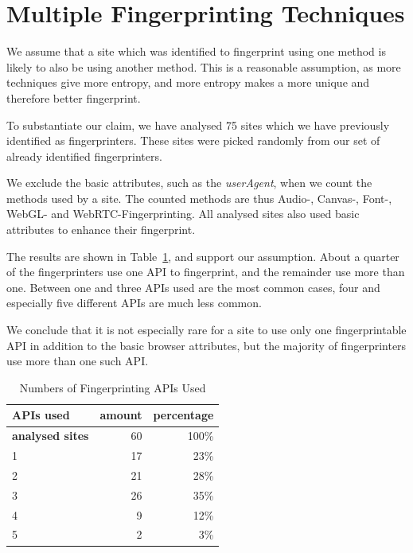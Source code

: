 \documentclass[
    fontsize=12pt,
    headings=small,
    parskip=half,
    bibliography=totoc,
    numbers=noenddot,
    open=any
    ]{scrreprt}
\begin{document}
\section{Multiple Fingerprinting Techniques}
\label{sec:correlation}

We assume that a site which was identified to fingerprint using one method is likely
to also be using another method.
This is a reasonable assumption, as more techniques give more entropy, and more entropy makes a more
unique and therefore better fingerprint.

To substantiate our claim, we have analysed 75 sites which we have previously identified as fingerprinters.
These sites were picked randomly from our set of already identified fingerprinters.

We exclude the basic attributes, such as the \textit{userAgent}, when we count the methods used by a site.
The counted methods are thus Audio-, Canvas-, Font-, WebGL- and WebRTC-Fingerprinting.
All analysed sites also used basic attributes to enhance their fingerprint.

The results are shown in Table~\ref{table:multiple_apis}, and support our assumption. About a quarter of the fingerprinters
use one API to fingerprint, and the remainder use more than one.
Between one and three APIs used are the most common cases, four and especially five different APIs are much less common.

We conclude that it is not especially rare for a site to use only one fingerprintable API in addition
to the basic browser attributes, but the majority of fingerprinters use more than one such API.

\begin{table}
\centering
\caption{Numbers of Fingerprinting APIs Used}
\begin{tabular}{l r r}
    \toprule
    APIs used & amount & percentage \\
    \midrule
    \textbf{analysed sites} & 60 & 100\% \\
    \midrule
    1 & 17 & 23\% \\
    2 & 21 & 28\% \\
    3 & 26 & 35\% \\
    4 & 9 & 12\% \\
    5 & 2 & 3\% \\
    \bottomrule
\end{tabular}
\label{table:multiple_apis}
\end{table}
\end{document}

